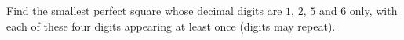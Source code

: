 Find the smallest perfect square whose decimal digits are $1$, $2$, $5$ and $6$ only, with each of these four digits appearing at least once (digits may repeat).
